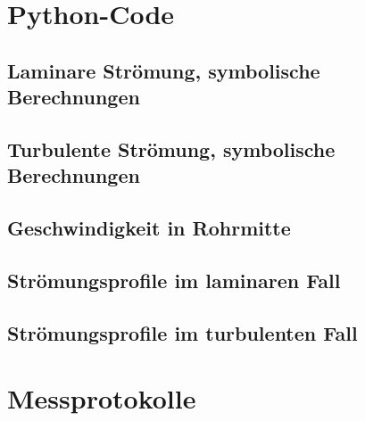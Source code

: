 \section{Python-Code}
\label{app:python}


\subsection{Laminare Str\"omung, symbolische Berechnungen}
\label{app:python:Qlaminar}



\subsection{Turbulente Str\"omung, symbolische Berechnungen}
\label{app:python:Qturb}



\clearpage
\subsection{Geschwindigkeit in Rohrmitte}
\label{app:python:rohrmitte}



\clearpage
\subsection{Str\"omungsprofile im laminaren Fall}
\label{app:python:laminar}



\clearpage
\subsection{Str\"omungsprofile im turbulenten Fall}
\label{app:python:turbulent}



\clearpage
\section{Messprotokolle}
\label{app:messprotokolle}
%
